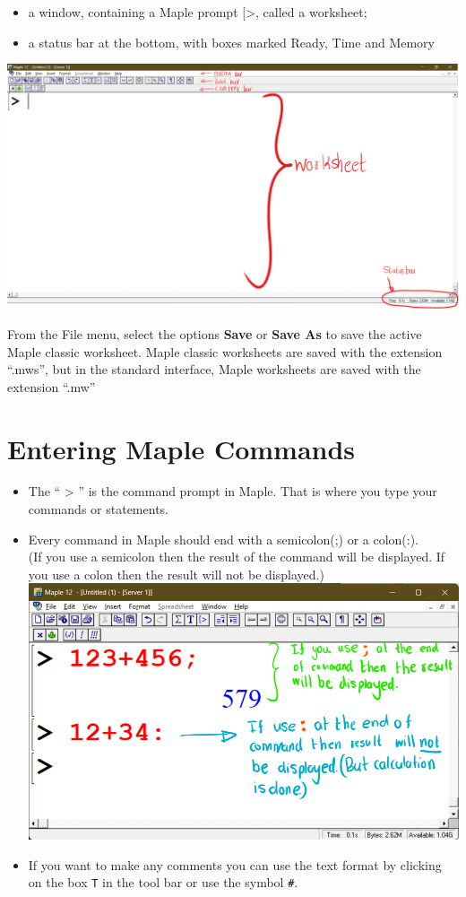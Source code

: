 \documentclass[
]{book}
\providecommand{\tightlist}{%
  \setlength{\itemsep}{0pt}\setlength{\parskip}{0pt}}
\theoremstyle{definition}
\theoremstyle{definition}
\theoremstyle{definition}
\theoremstyle{definition}
\theoremstyle{remark}
\begin{document}
\begin{itemize}
\tightlist
\item
  a window, containing a Maple prompt {[}\textgreater, called a worksheet;
\item
  a status bar at the bottom, with boxes marked Ready, Time and Memory
\end{itemize}

\includegraphics{figures/Lesson 1/fig2.png}

From the File menu, select the options \textbf{Save} or \textbf{Save As} to save the active Maple classic worksheet.
Maple classic worksheets are saved with the extension ``.mws'', but in the standard interface, Maple worksheets are saved with the extension ``.mw''

\section{Entering Maple Commands}\label{entering-maple-commands}

\begin{itemize}
\tightlist
\item
  The `` \textgreater{} '' is the command prompt in Maple. That is where you type your commands or statements.
\item
  Every command in Maple should end with a semicolon(;) or a colon(:).\\
  (If you use a semicolon then the result of the command will be displayed. If you use a colon then the result will not be displayed.)
  \includegraphics{figures/Lesson 1/fig3.png}
\item
  If you want to make any comments you can use the text format by clicking on the box \texttt{T} in the tool bar or use the symbol \texttt{\#}.
\end{itemize}
\end{document}
